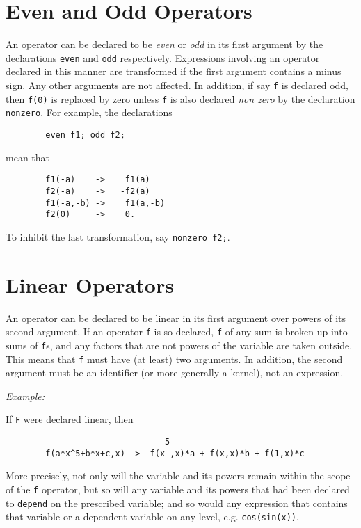 \section{Even and Odd Operators}
\hypertarget{command:EVEN}{}
\hypertarget{command:ODD}{}
\hypertarget{command:NONZERO}{}
An operator can be declared to be \emph{even} or \emph{odd} in its first
argument by the declarations \texttt{even} and
\texttt{odd} respectively.  Expressions involving an operator
declared in this manner are transformed if the first argument contains a
minus sign.  Any other arguments are not affected.  In addition, if say
\texttt{f} is declared odd, then \texttt{f(0)} is replaced by zero unless
\texttt{f} is also declared \emph{non zero} by the declaration
\texttt{nonzero}.  For example, the declarations
\begin{verbatim}
        even f1; odd f2;
\end{verbatim}
mean that
\begin{verbatim}
        f1(-a)    ->    f1(a)
        f2(-a)    ->   -f2(a)
        f1(-a,-b) ->    f1(a,-b)
        f2(0)     ->    0.
\end{verbatim}
To inhibit the last transformation, say \texttt{nonzero f2;}.

\section{Linear Operators}
\hypertarget{command:LINEAR}{}
An operator can be declared to be linear in its first argument over powers
of its second argument.  If an operator \texttt{f} is so declared, \texttt{f} of
any sum is broken up into sums of \texttt{f}s, and any factors that are not
powers of the variable are taken outside.  This means that \texttt{f} must
have (at least) two arguments.  In addition, the second argument must be
an identifier (or more generally a kernel), not an expression.

\textit{Example:}

If \texttt{F} were declared linear, then
\begin{verbatim}
                                5
        f(a*x^5+b*x+c,x) ->  f(x ,x)*a + f(x,x)*b + f(1,x)*c
\end{verbatim}
More precisely, not only will the variable and its powers remain within the
scope of the \texttt{f} operator, but so will any variable and its powers that
had been declared to \texttt{depend} on the prescribed variable; and so would
any expression that contains that variable or a dependent variable on any
level, e.g. \texttt{cos(sin(x))}.

